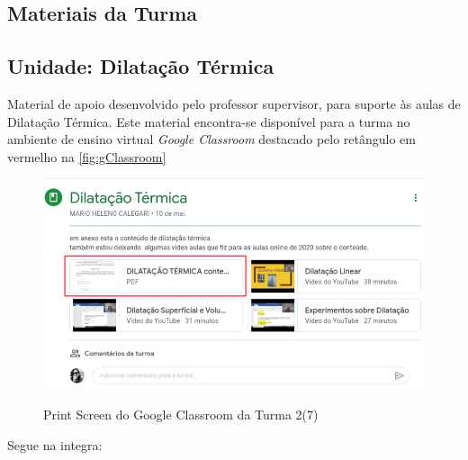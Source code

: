 \begin{anexosenv}     
    \chapter{Materiais da Turma}
    \label{anx:materiaisAnexo}
    
    \section{Unidade: Dilatação Térmica}
    \label{sec:materialAnexoDilatacaoTermica}
    Material de apoio desenvolvido pelo professor supervisor, para suporte às aulas de Dilatação Térmica. Este material encontra-se disponível para a turma no ambiente de ensino virtual \emph{Google Classroom} destacado pelo retângulo em vermelho na \autoref{fig:gClassroom}
    \vspace{1cm}
    \begin{figure}[!h]
        \centering
        \footnotesize
        \caption{Print Screen do Google Classroom da Turma 2(7)}
        \includegraphics[width=\textwidth]{03-elementos/03.2_textual/03.2.1_fig/google-class01.png}
        \label{fig:gClassroom}
    \end{figure}

    Segue na integra:
    
\end{anexosenv}
